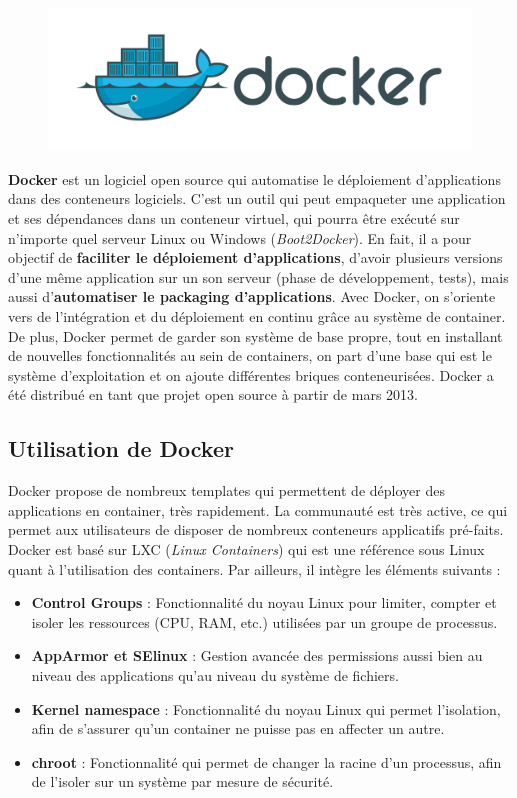 \begin{onehalfspace}
\begin{figure}
\centering
\includegraphics[scale=0.15]{chapitre2/assets/docker}
\end{figure}
\noindent \textbf{Docker} est un logiciel open source qui automatise le déploiement d'applications dans des conteneurs logiciels. C'est un outil qui peut empaqueter une application et ses dépendances dans un conteneur virtuel, qui pourra être exécuté sur n'importe quel serveur Linux ou Windows (\emph{Boot2Docker}). En fait, il a pour objectif de \textbf{faciliter le déploiement d'applications}, d'avoir plusieurs versions d'une même application sur un son serveur (phase de développement, tests), mais aussi d'\textbf{automatiser le packaging d'applications}. Avec Docker, on s'oriente vers de l'intégration et du déploiement en continu grâce au système de container. De plus, Docker permet de garder son système de base propre, tout en installant de nouvelles fonctionnalités au sein de containers, on part d'une base qui est le système d'exploitation et on ajoute différentes briques conteneurisées. Docker a été distribué en tant que projet open source à partir de mars 2013.

\subsection{Utilisation de Docker}
Docker propose de nombreux templates qui permettent de déployer des applications en container, très rapidement. La communauté est très active, ce qui permet aux utilisateurs de disposer de nombreux conteneurs applicatifs pré-faits.
Docker est basé sur LXC (\emph{Linux Containers}) qui est une référence sous Linux quant à l'utilisation des containers. Par ailleurs, il intègre les éléments suivants :
\begin{itemize}
\item \textbf{Control Groups} : Fonctionnalité du noyau Linux pour limiter, compter et isoler les ressources (CPU, RAM, etc.) utilisées par un groupe de processus.
\item \textbf{AppArmor et SElinux} : Gestion avancée des permissions aussi bien au niveau des applications qu'au niveau du système de fichiers.
\item \textbf{Kernel namespace} : Fonctionnalité du noyau Linux qui permet l'isolation, afin de s'assurer qu'un container ne puisse pas en affecter un autre.
\item \textbf{chroot} : Fonctionnalité qui permet de changer la racine d'un processus, afin de l'isoler sur un système par mesure de sécurité.
\end{itemize}


\end{onehalfspace}
